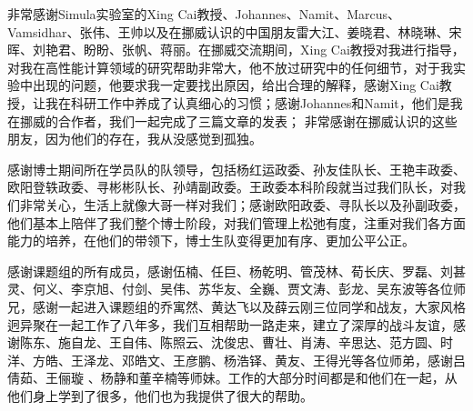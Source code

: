 \begin{ack}
非常感谢Simula实验室的Xing Cai教授、Johannes、Namit、Marcus、Vamsidhar、张伟、王帅以及在挪威认识的中国朋友雷大江、姜晓君、林晓琳、宋晖、刘艳君、盼盼、张帆、蒋丽。在挪威交流期间，Xing Cai教授对我进行指导，对我在高性能计算领域的研究帮助非常大，他不放过研究中的任何细节，对于我实验中出现的问题，他要求我一定要找出原因，给出合理的解释，感谢Xing Cai教授，让我在科研工作中养成了认真细心的习惯；感谢Johannes和Namit，他们是我在挪威的合作者，我们一起完成了三篇文章的发表；
非常感谢在挪威认识的这些朋友，因为他们的存在，我从没感觉到孤独。

感谢博士期间所在学员队的队领导，包括杨红运政委、孙友佳队长、王艳丰政委、欧阳登轶政委、寻彬彬队长、孙靖副政委。王政委本科阶段就当过我们队长，对我们非常关心，生活上就像大哥一样对我们；感谢欧阳政委、寻队长以及孙副政委，他们基本上陪伴了我们整个博士阶段，对我们管理上松弛有度，注重对我们各方面能力的培养，在他们的带领下，博士生队变得更加有序、更加公平公正。

感谢课题组的所有成员，感谢伍楠、任巨、杨乾明、管茂林、荀长庆、罗磊、刘甚灵、何义、李京旭、付剑、吴伟、苏华友、全巍、贾文涛、彭龙、吴东波等各位师兄，感谢一起进入课题组的乔寓然、黄达飞以及薛云刚三位同学和战友，大家风格迥异聚在一起工作了八年多，我们互相帮助一路走来，建立了深厚的战斗友谊，感谢陈东、施自龙、王自伟、陈照云、沈俊忠、曹壮、肖涛、辛思达、范方圆、时洋、方皓、王泽龙、邓皓文、王彦鹏、杨浩铎、黄友、王得光等各位师弟，感谢吕倩茹、王俪璇 、杨静和董辛楠等师妹。工作的大部分时间都是和他们在一起，从他们身上学到了很多，他们也为我提供了很大的帮助。


\end{ack}
